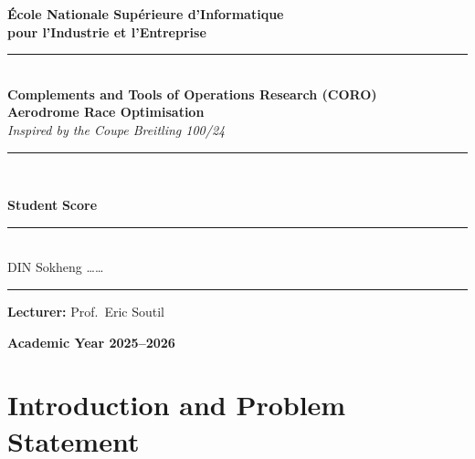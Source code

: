 \documentclass[12pt, a4paper]{article}
\begin{document}
\begin{titlepage}
\thispagestyle{empty}
\begin{center}
\vspace*{1.5cm}

{\fontsize{16pt}{20pt}\selectfont
  \textbf{\'Ecole Nationale Sup\'erieure d'Informatique\\
          pour l'Industrie et l'Entreprise}}\\[0.6cm]

\textcolor{ensiie}{\rule{\textwidth}{2pt}}\\[0.4cm]

{\large \textbf{Complements and Tools of Operations Research (CORO)}}\\[0.4cm]

{\LARGE \textbf{Aerodrome Race Optimisation}}\\[0.3cm]
{\large \textit{Inspired by the Coupe Breitling 100/24}}\\[0.5cm]

\textcolor{ensiie}{\rule{\textwidth}{2pt}}\\[1.5cm]

\begin{flushleft}
\textbf{Student} \hfill \textbf{Score} \\
\rule{\textwidth}{1pt} \\[0.2cm]
DIN Sokheng \hfill \ldots\ldots \\[0.3cm]
\rule{\textwidth}{1pt}
\end{flushleft}

\vspace{0.8cm}

\begin{flushleft}
\textbf{Lecturer:} Prof.\ Eric Soutil
\end{flushleft}

\vspace{0.5cm}
\textbf{\large Academic Year 2025--2026}

\vfill
\end{center}
\end{titlepage}

\tableofcontents
\newpage

\section{Introduction and Problem Statement}
\end{document}
